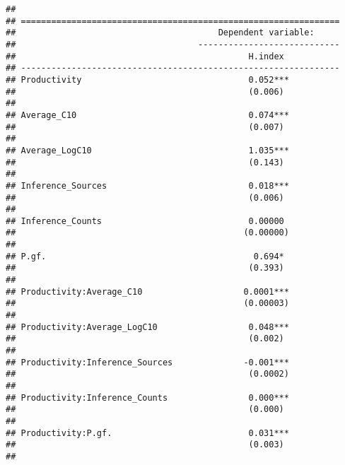 \documentclass[
]{article}
\begin{document}
\begin{verbatim}
## 
## ===============================================================
##                                        Dependent variable:     
##                                    ----------------------------
##                                              H.index           
## ---------------------------------------------------------------
## Productivity                                 0.052***          
##                                              (0.006)           
##                                                                
## Average_C10                                  0.074***          
##                                              (0.007)           
##                                                                
## Average_LogC10                               1.035***          
##                                              (0.143)           
##                                                                
## Inference_Sources                            0.018***          
##                                              (0.006)           
##                                                                
## Inference_Counts                             0.00000           
##                                             (0.00000)          
##                                                                
## P.gf.                                         0.694*           
##                                              (0.393)           
##                                                                
## Productivity:Average_C10                    0.0001***          
##                                             (0.00003)          
##                                                                
## Productivity:Average_LogC10                  0.048***          
##                                              (0.002)           
##                                                                
## Productivity:Inference_Sources              -0.001***          
##                                              (0.0002)          
##                                                                
## Productivity:Inference_Counts                0.000***          
##                                              (0.000)           
##                                                                
## Productivity:P.gf.                           0.031***          
##                                              (0.003)           
##                                                                

\end{verbatim}
\end{document}
